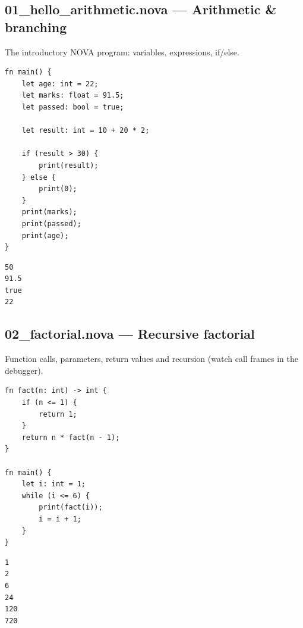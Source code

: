 \subsection*{01\_hello\_arithmetic.nova --- Arithmetic \& branching}
\noindent The introductory NOVA program: variables, expressions, if/else.
\begin{lstlisting}[language=nova,]
fn main() {
    let age: int = 22;
    let marks: float = 91.5;
    let passed: bool = true;

    let result: int = 10 + 20 * 2;

    if (result > 30) {
        print(result);
    } else {
        print(0);
    }
    print(marks);
    print(passed);
    print(age);
}
\end{lstlisting}
\begin{tcolorbox}[colback=green!4,colframe=green!45!black,title={Program output (optimized VM)},fonttitle=\bfseries\small,boxsep=2pt,left=4pt,right=4pt,top=2pt,bottom=2pt]
\begin{lstlisting}[basicstyle=\ttfamily\scriptsize,frame=none,backgroundcolor=\color{white}]
50
91.5
true
22
\end{lstlisting}
\end{tcolorbox}
\subsection*{02\_factorial.nova --- Recursive factorial}
\noindent Function calls, parameters, return values and recursion (watch call frames in the debugger).
\begin{lstlisting}[language=nova,]
fn fact(n: int) -> int {
    if (n <= 1) {
        return 1;
    }
    return n * fact(n - 1);
}

fn main() {
    let i: int = 1;
    while (i <= 6) {
        print(fact(i));
        i = i + 1;
    }
}
\end{lstlisting}
\begin{tcolorbox}[colback=green!4,colframe=green!45!black,title={Program output (optimized VM)},fonttitle=\bfseries\small,boxsep=2pt,left=4pt,right=4pt,top=2pt,bottom=2pt]
\begin{lstlisting}[basicstyle=\ttfamily\scriptsize,frame=none,backgroundcolor=\color{white}]
1
2
6
24
120
720
\end{lstlisting}
\end{tcolorbox}
